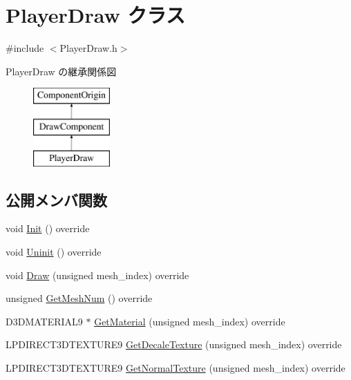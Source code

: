 \hypertarget{class_player_draw}{}\section{Player\+Draw クラス}
\label{class_player_draw}


{\ttfamily \#include $<$Player\+Draw.\+h$>$}

Player\+Draw の継承関係図\begin{figure}[H]
\begin{center}
\leavevmode
\includegraphics[height=3.000000cm]{class_player_draw}
\end{center}
\end{figure}
\subsection*{公開メンバ関数}
\begin{DoxyCompactItemize}
\item 
void \mbox{\hyperlink{class_player_draw_ad79a0fbeb618e0913822b573e5d0be68}{Init}} () override
\item 
void \mbox{\hyperlink{class_player_draw_a917b2947914287f23d87ca75cd68f553}{Uninit}} () override
\item 
void \mbox{\hyperlink{class_player_draw_a1d58f14658bf5e058f67c6754d9898e7}{Draw}} (unsigned mesh\+\_\+index) override
\item 
unsigned \mbox{\hyperlink{class_player_draw_adbf5776a7a2d7f255661e0527f673eaa}{Get\+Mesh\+Num}} () override
\item 
D3\+D\+M\+A\+T\+E\+R\+I\+A\+L9 $\ast$ \mbox{\hyperlink{class_player_draw_abcc7b934dbbe08215291dfd1baa2ac31}{Get\+Material}} (unsigned mesh\+\_\+index) override
\item 
L\+P\+D\+I\+R\+E\+C\+T3\+D\+T\+E\+X\+T\+U\+R\+E9 \mbox{\hyperlink{class_player_draw_af139860a0e62553110f939a62d7b5e8e}{Get\+Decale\+Texture}} (unsigned mesh\+\_\+index) override
\item 
L\+P\+D\+I\+R\+E\+C\+T3\+D\+T\+E\+X\+T\+U\+R\+E9 \mbox{\hyperlink{class_player_draw_a96eb31c32c0016cd6c908dc67032a7ed}{Get\+Normal\+Texture}} (unsigned mesh\+\_\+index) override
\end{DoxyCompactItemize}
